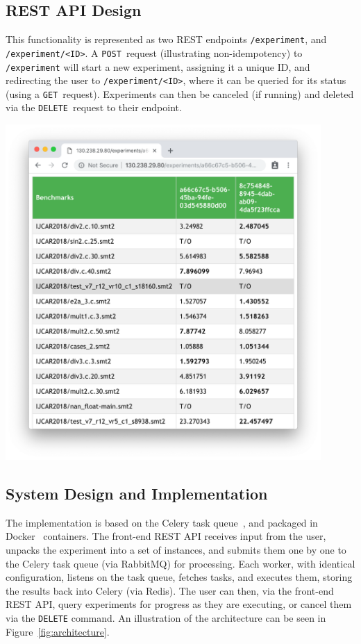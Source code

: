 \documentclass[a4paper]{IEEEtran}
\begin{document}
\subsection{REST API Design}

This functionality is represented as two REST endpoints \texttt{/experiment},
and \texttt{/experiment/<ID>}. A \texttt{POST}~request (illustrating
non-idempotency) to \texttt{/experiment} will start a new experiment, assigning
it a unique ID, and redirecting the user to \texttt{/experiment/<ID>}, where it
can be queried for its status (using a \texttt{GET}~request). Experiments can
then be canceled (if running) and deleted via the \texttt{DELETE}~request to
their endpoint.

\begin{Figure}
  \centering \includegraphics[width=0.9\textwidth]{table_view}
  \label{fig:table_view}
\end{Figure}

\subsection{System Design and Implementation}

The implementation is based on the Celery task queue~\cite{celery}, and packaged
in Docker~\cite{docker} containers. The front-end REST API receives input from
the user, unpacks the experiment into a set of instances, and submits them one
by one to the Celery task queue (via RabbitMQ) for processing. Each worker, with
identical configuration, listens on the task queue, fetches tasks, and executes
them, storing the results back into Celery (via Redis). The user can then, via
the front-end REST API, query experiments for progress as they are executing, or
cancel them via the \texttt{DELETE} command. An illustration of the architecture
can be seen in Figure~\ref{fig:architecture}.
\end{document}
